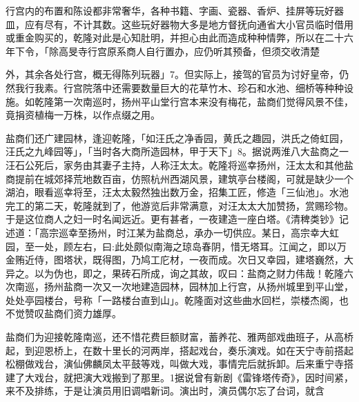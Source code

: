 行宫内的布置和陈设都非常奢华，各种书籍、字画、瓷器、香炉、挂屏等玩好器皿，应有尽有，不计其数。这些玩好器物大多是地方督抚向通省大小官员临时借用或重金购买的，乾隆对此是心知肚明，并担心由此而造成种种情弊，所以在二十六年下令，「除高旻寺行宫原系商人自行置办，应仍听其预备，但须交收清楚

\vfill
\begin{BookNotes}
\end{BookNotes}

\noindent 外，其余各处行宫，概无得陈列玩器」7。但实际上，接驾的官员为讨好皇帝，仍然我行我素。行宫院落中还需要数量巨大的花草竹木、珍石和水池、细桥等种种设施。如乾隆第一次南巡时，扬州平山堂行宫本来没有梅花，盐商们觉得风景不佳，竟捐资植梅一万株，以作点缀之用。

盐商们还广建园林，逢迎乾隆，「如汪氏之净香园，黄氏之趣园，洪氏之倚虹园，汪氏之九峰园等」，「当时各大商所造园林，甲于天下」8。据说两淮八大盐商之一汪石公死后，家务由其妻子主持，人称汪太太。乾隆将巡幸扬州，汪太太和其他盐商提前在城郊择荒地数百亩，仿照杭州西湖风景，建筑亭台楼阁，可就是缺少一个湖泊，眼看巡幸将至，汪太太毅然独出数万金，招集工匠，修造「三仙池」。水池完工的第二天，乾隆就到了，他游览后非常满意，对汪太太大加赞扬，赏赐珍物。于是这位商人之妇一时名闻远近。更有甚者，一夜建造一座白塔。《清稗类钞》记述道：「高宗巡幸至扬州，时江某为盐商总，承办一切供应。某日，高宗幸大虹园，至一处，顾左右，曰:此处颇似南海之琼岛春阴，惜无塔耳。江闻之，即以万金贿近侍，图塔状，既得图，乃鸠工庀材，一夜而成。次日又幸园，建塔巍然，大异之。以为伪也，即之，果砖石所成，询之其故，叹曰：盐商之财力伟哉！乾隆六次南巡，扬州盐商一次又一次地建造园林，园林加上行宫，从扬州城里到平山堂，处处亭园楼台，号称「一路楼台直到山」。乾隆面对这些曲水回栏，崇楼杰阁，也不觉赞叹盐商们资力雄厚。

盐商们为迎接乾隆南巡，还不惜花费巨额财富，蓄养花、雅两部戏曲班子，从高桥起，到迎恩桥上，在数十里长的河两岸，搭起戏台，奏乐演戏。如在天宁寺前搭起松棚做戏台，演仙佛麟凤太平鼓等戏，叫做大戏，事情完后就拆卸。后来重宁寺搭建了大戏台，就把演大戏搬到了那里。1据说曾有新剧《雷锋塔传奇》，因时间紧，来不及排练，于是让演员用旧调唱新词。演出时，演员偶尔忘了台词，就含

\vfill
\begin{BookNotes}
\end{BookNotes}

